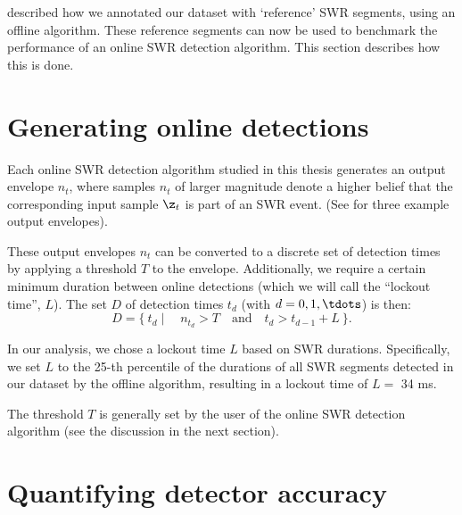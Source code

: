 \label{ch:eval}

 described how we annotated our dataset with `reference' SWR segments, using an offline algorithm. These reference segments can now be used to benchmark the performance of an online SWR detection algorithm. This section describes how this is done.



\section{Generating online detections}

Each online SWR detection algorithm studied in this thesis generates an output envelope $n_t$, where samples $n_t$ of larger magnitude denote a higher belief that the corresponding input sample $\z_t$ is part of an SWR event. (See  for three example output envelopes).

These output envelopes $n_t$ can be converted to a discrete set of detection times by applying a threshold $T$ to the envelope.\footnotemark{} Additionally, we require a certain minimum duration between online detections (which we will call the ``lockout time'', $L$). The set $D$ of detection times $t_d$ (with $d = 0, 1, \tdots$) is then:
\begin{equation}
D = \{ \ t_d \mid \quad  n_{t_d} > T  \quad 
                  \text{and} \quad  t_d > t_{d-1} + L  \ \}.
\end{equation}



In our analysis, we chose a lockout time $L$ based on SWR durations. Specifically, we set $L$ to the 25-th percentile of the durations of all SWR segments detected in our dataset by the offline algorithm, resulting in a lockout time of $L = $ 34 ms.

The threshold $T$ is generally set by the user of the online SWR detection algorithm (see the discussion in the next section).



\section{Quantifying detector accuracy}


